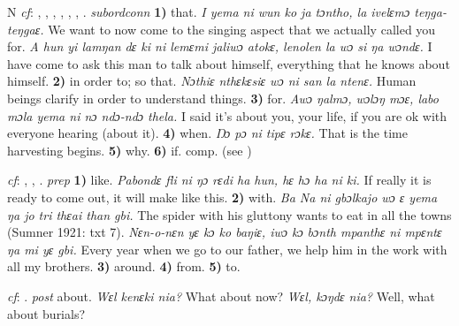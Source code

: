 \begin{letter}{N}
 \textit{cf}: , , , , , , . \textit{subordconn} \textbf{1)} that. \textit{I yema ni wun ko ja tɔntho, la ivelɛmɔ teŋga-teŋgaɛ.} We want to now come to the singing aspect that we actually called you for. \textit{A hun yi lamŋan dɛ ki ni lemɛmi jaliwɔ atokɛ, lenolen la wɔ si ŋa wɔndɛ.} I have come to ask this man to talk about himself, everything that he knows about himself. \textbf{2)} in order to; so that. \textit{Nɔthiɛ nthɛkɛsiɛ wɔ ni san la ntenɛ.} Human beings clarify in order to understand things. \textbf{3)} for. \textit{Awɔ ŋalmɔ, wɔlɔŋ mɔɛ, labo mɔla yema ni nɔ ndɔ-ndɔ thela.} I said it's about you, your life, if you are ok with everyone hearing (about it). \textbf{4)} when. \textit{Ŋɔ pɔ ni tipɛ rɔkɛ.} That is the time harvesting begins. \textbf{5)} why. \textbf{6)} if. comp.  (see ) 

 \textit{cf}: , , . \textit{prep} \textbf{1)} like. \textit{Pabondɛ fli ni ŋɔ rɛdi ha hun, hɛ hɔ ha ni ki.} If really it is ready to come out, it will make like this. \textbf{2)} with. \textit{Ba Na ni gbɔlkajo wɔ ɛ yema ŋa jo tri thɛai than gbi.} The spider with his gluttony wants to eat in all the towns (Sumner 1921: txt 7). \textit{Nɛn-o-nɛn yɛ kɔ ko baŋiɛ, iwɔ kɔ bɔnth mpanthɛ ni mpɛntɛ ŋa mi yɛ gbi.} Every year when we go to our father, we help him in the work with all my brothers. \textbf{3)} around. \textbf{4)} from. \textbf{5)} to.

 \textit{cf}: . \textit{post} about. \textit{Wɛl kenɛki nia?} What about now? \textit{Wɛl, kɔŋdɛ nia?} Well, what about burials?


\end{letter}
